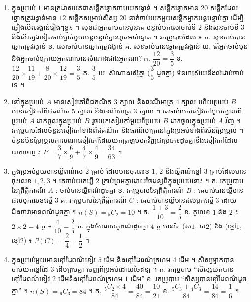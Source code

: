 \begin{enumerate}[1]
  \ans
  $n(S) = 36$ ។ ក. (ខៀវ, ក្រហម) $= (2, 1), (4, 2), (6, 3)$ ៖ $P = \dfrac{3}{36} = \dfrac{1}{12}$ \quad ខ. $(1,4), (2,3), (3,2), (4,1)$ ៖ $P = \dfrac{4}{36} = \dfrac{1}{9}$ ។
  \item ក្នុងប្រអប់ $1$ មានក្រដាសបត់ជាសន្លឹកឆ្នោតចាប់យករង្វាន់ ។ សន្លឹកឆ្នោតមាន $20$ សន្លឹកដែលឆ្នោតត្រូវរង្វាន់មាន $12$ សន្លឹកសម្រាប់សិស្ស $20$ នាក់ចាប់យកមួយសន្លឹកម្នាក់បន្តបន្ទាប់គ្នា ដើម្បីផ្ទៀងមើលរង្វាន់រៀងៗខ្លួន ។ សុខជាអ្នកចាប់បានមុនគេ បន្ទាប់មកសោចាប់ទី $2$ និងសនចាប់ទី $3$ និងសិស្សឯទៀតចាប់ម្នាក់មួយបន្តបន្ទាប់គ្នារហូតអស់ឆ្នោត ។ រកប្រូបាបដែល ៖ \quad ក. សុខចាប់បានឆ្នោតត្រូវរង្វាន់ \quad ខ. សោចាប់បានឆ្នោតត្រូវរង្វាន់ \quad គ. សនចាប់បានឆ្នោតត្រូវរង្វាន់ \quad ឃ. តើអ្នកចាប់មុននិងអ្នកចាប់ក្រោយអ្នកណាមានសំណាងជាងអ្នកណា?
  \ans
  ក. $\dfrac{12}{20} = \dfrac{3}{5}$ \quad ខ. $\dfrac{12}{20}\times\dfrac{11}{19} + \dfrac{8}{20}\times\dfrac{12}{19} = \dfrac{3}{5}$ \quad គ. $\dfrac{3}{5}$ \quad ឃ. សំណាងស្មើគ្នា ($\dfrac{3}{5}$ ដូចគ្នា) មិនអាស្រ័យនឹងលំដាប់ចាប់ទេ ។
  \item នៅក្នុងប្រអប់ $A$ មានសៀវភៅពីជគណិត $3$ ក្បាល និងធរណីមាត្រ $4$ ក្បាល ហើយប្រអប់ $B$ មានសៀវភៅពីជគណិត $5$ ក្បាល និងធរណីមាត្រ $3$ ក្បាល ។ គេចាប់យកសៀវភៅមួយក្បាលពីប្រអប់ $A$ ដាក់ចូលក្នុងប្រអប់ $B$ រួចយកសៀវភៅមួយពីប្រអប់ $B$ ដាក់ចូលក្នុងប្រអប់ $A$ វិញ ។ រកប្រូបាបដែលចំនួនសៀវភៅទាំងពីជគណិត និងធរណីមាត្រនៅក្នុងប្រអប់ទាំងពីរមិនប្រែប្រួល ។
  \ans
  ចំនួនមិនប្រែប្រួលកាលណាសៀវភៅដែលយកត្រឡប់មកវិញជាប្រភេទដូចគ្នានឹងសៀវភៅដែលយកចេញ ៖ $P = \dfrac{3}{7}\times\dfrac{6}{9} + \dfrac{4}{7}\times\dfrac{4}{9} = \dfrac{34}{63}$ ។
  \item ក្នុងប្រអប់មួយមានឃ្លីពណ៌ស $2$ គ្រាប់ ដែលមានចុះលេខ $1$, $2$ និងឃ្លីពណ៌ខ្មៅ $3$ គ្រាប់ដែលមានចុះលេខ $1, 2, 3$ ។ គេចាប់យកឃ្លី $2$ គ្រាប់ព្រមគ្នាដោយចៃដន្យពីក្នុងប្រអប់នោះ ។ \quad ក. រកប្រូបាបនៃព្រឹត្តិការណ៍ $A$ : ចាប់បានឃ្លីពណ៌ដូចគ្នា \quad ខ. រកប្រូបាបនៃព្រឹត្តិការណ៍ $B$ : គេចាប់បានឃ្លីមានផលបូកលេខស្មើ $3$ \quad គ. រកប្រូបាបនៃព្រឹត្តិការណ៍ $C$ : គេចាប់បានឃ្លីមានផលបូកស្មើ $3$ ដោយដឹងថាវាមានពណ៌ដូចគ្នា ។
  \ans
  $n(S) = {}_5C_2 = 10$ ។ ក. $\dfrac{1 + 3}{10} = \dfrac{2}{5}$ \quad ខ. គូលេខ $1$ និង $2$ ៖ $2\times 2 = 4$ គូ ៖ $\dfrac{4}{10} = \dfrac{2}{5}$ \quad គ. ក្នុងចំណោមគូពណ៌ដូចគ្នា $4$ គូ មានតែ (ស$1$, ស$2$) និង (ខ្មៅ$1$, ខ្មៅ$2$) ៖ $P(C) = \dfrac{2}{4} = \dfrac{1}{2}$ ។
  \item ក្នុងប្រអប់មួយមានខ្មៅដៃពណ៌ខៀវ $5$ ដើម និងខ្មៅដៃពណ៌ក្រហម $4$ ដើម ។ សិស្សម្នាក់បានចាប់យកខ្មៅដៃ $3$ ដើមព្រមគ្នា ចេញពីប្រអប់ដោយចៃដន្យ ។ \quad ក. រកប្រូបាប “សិស្សយកបានខ្មៅដៃពណ៌ខៀវ $2$ ដើមនិងខ្មៅដៃពណ៌ក្រហម $1$ ដើម” \quad ខ. រកប្រូបាប “សិស្សបានខ្មៅដៃពណ៌ដូចគ្នា” ។
  \ans
  $n(S) = {}_9C_3 = 84$ ។ ក. $\dfrac{{}_5C_2\times 4}{84} = \dfrac{40}{84} = \dfrac{10}{21}$ \quad ខ. $\dfrac{{}_5C_3 + {}_4C_3}{84} = \dfrac{14}{84} = \dfrac{1}{6}$ ។

\end{enumerate}
